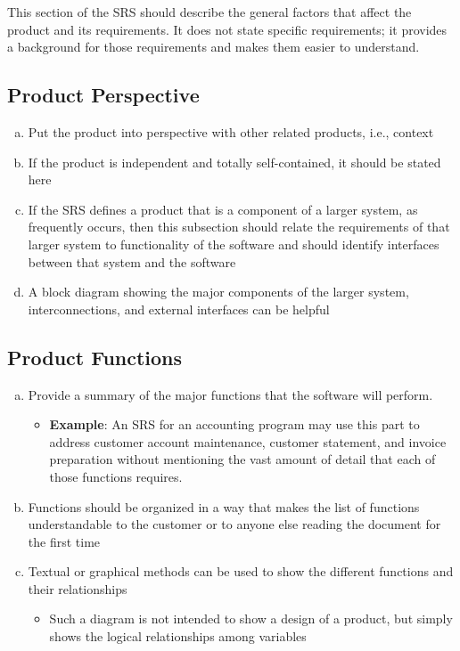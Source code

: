 \documentclass[]{article}
\begin{document}
This section of the SRS should describe the general factors that affect the product and its requirements. It does not state specific requirements; it provides a background for those requirements and makes them easier to understand.

\subsection{Product Perspective}
\label{sub:product_perspective}
\begin{enumerate}[a)]
	\item Put the product into perspective with other related products, i.e., context
	\item If the product is independent and totally self-contained, it should be stated here
	\item If the SRS defines a product that is a component of a larger system, as frequently occurs, then this subsection should relate the requirements of that larger system to functionality of the software and should identify interfaces between that system and the software
	\item A block diagram showing the major components of the larger system, interconnections, and external interfaces can be helpful
\end{enumerate}

\subsection{Product Functions}
\label{sub:product_functions}
\begin{enumerate}[a)]
	\item Provide a summary of the major functions that the software will perform.
	\begin{itemize}
		\item \textbf{Example}: An SRS for an accounting program may use this part to address customer account maintenance, customer statement, and invoice preparation without mentioning the vast amount of detail that each of those functions requires.
	\end{itemize}
	\item Functions should be organized in a way that makes the list of functions understandable to the customer or to anyone else reading the document for the first time
	\item Textual or graphical methods can be used to show the different functions and their relationships
	\begin{itemize}
		\item Such a diagram is not intended to show a design of a product, but simply shows the logical relationships among variables
	\end{itemize} 
\end{enumerate}
\end{document}
